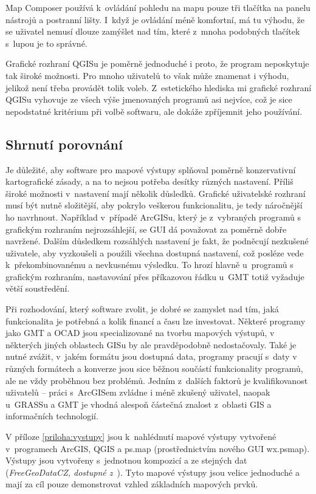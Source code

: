 \documentclass[a4paper,12pt,draft]{article}
\begin{document}
Map Composer používá k~ovládání pohledu na mapu pouze tři tlačítka
na panelu nástrojů a postranní lišty. I~když je ovládání méně
komfortní, má tu výhodu, že se uživatel nemusí dlouze zamýšlet nad
tím, které z~mnoha podobných tlačítek s~lupou je to správné.

Grafické rozhraní QGISu je poměrně jednoduché i proto, že program
neposkytuje tak široké možnosti. Pro mnoho uživatelů to však
může znamenat i výhodu, jelikož není třeba provádět tolik voleb.
Z~estetického hlediska mi grafické rozhraní QGISu vyhovuje ze všech výše
jmenovaných programů asi nejvíce, což je sice nepodstatné kritérium
při volbě softwaru, ale dokáže zpříjemnit jeho používání.

\subsection{Shrnutí porovnání}
Je důležité, aby software pro mapové výstupy splňoval poměrně
konzervativní kartografické zásady, a na to nejsou potřeba
desítky různých nastavení. Příliš široké možnosti v~nastavení
mají několik důsledků. Grafické uživatelské rozhraní musí být nutně
složitější, aby pokrylo veškerou funkcionalitu, je tedy náročnější
ho navrhnout. Například v~případě ArcGISu, který je z~vybraných programů s
grafickým rozhraním nejrozsáhlejší, se GUI dá považovat za poměrně dobře
navržené. 
Dalším důsledkem rozsáhlých nastavení je fakt, že podněcují nezkušené uživatele,
aby vyzkoušeli a použili všechna dostupná nastavení, což posléze vede
k~překombinovanému a nevkusnému výsledku. To hrozí hlavně u~programů s
grafickým rozhraním, nastavování přes příkazovou řádku u~GMT totiž vyžaduje
větší soustředění.

Při rozhodování, který software zvolit, je dobré se zamyslet nad tím, jaká
funkcionalita je potřebná a kolik financí a času lze investovat. Některé
programy jako GMT a OCAD jsou specializované na tvorbu mapových výstupů, v
některých jiných oblastech GISu by ale pravděpodobně nedostačovaly. Také je
nutné zvážit, v~jakém formátu jsou dostupná data, programy pracují s~daty v
různých formátech a konverze jsou sice běžnou součástí funkcionality programů,
ale ne vždy proběhnou bez problémů. Jedním z~dalších faktorů je kvalifikovanost
uživatelů -- práci s~ArcGISem zvládne i méně zkušený uživatel, naopak u~GRASSu
a GMT je vhodná alespoň částečná znalost z~oblasti GIS a informačních
technologií.

V příloze \ref{priloha:vystupy} jsou k~nahlédnutí mapové výstupy vytvořené
v~programech ArcGIS, QGIS a ps.map (prostřednictvím nového GUI wx.psmap).
Výstupy jsou vytvořeny s~jednotnou kompozicí a ze stejných dat
(\emph{FreeGeoDataCZ, dostupné z~\cite{FreeGeoDataCZ}}).
Tyto mapové výstupy jsou velice jednoduché a mají za cíl pouze demonstrovat
vzhled základních mapových prvků.
\end{document}
